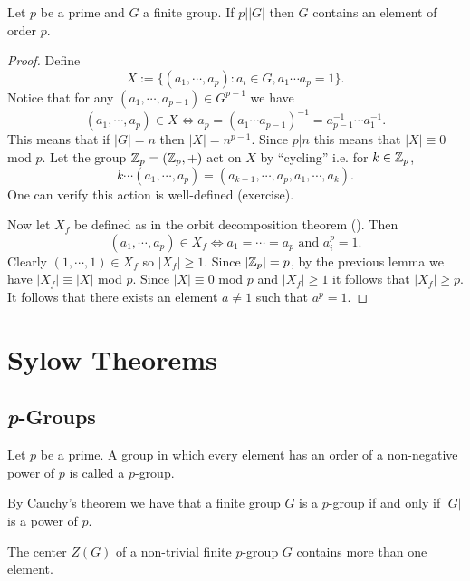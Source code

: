 \documentclass[11pt]{article}
\begin{document}
\begin{theorem}
    Let $p$ be a prime and $G$ a finite group. If $p\big||G|$ then $G$ contains an element of order $p$.
\end{theorem}

\begin{proof}
    Define
    \[X:=\{(a_1,\cdots,a_p):a_i\in G,a_1\cdots a_p=1\}.\]
    Notice that for any $(a_1,\cdots,a_{p-1})\in G^{p-1}$ we have
    \[(a_1,\cdots, a_p)\in X\iff a_p=(a_1\cdots a_{p-1})^{-1}=a_{p-1}^{-1}\cdots a_1^{-1}.\]
    This means that if $|G|=n$ then $|X|=n^{p-1}$. Since $p|n$ this means that $|X|\equiv0$ mod $p$. Let the group $\mathbb{Z}_p=(\mathbb{Z}_p,+)$ act on $X$ by ``cycling'' i.e. for $k\in\mathbb{Z}_p$,
    \[k\cdots(a_1,\cdots,a_p)=(a_{k+1},\cdots,a_p,a_1,\cdots,a_k).\]
    One can verify this action is well-defined (exercise).
    
    Now let $X_f$ be defined as in the orbit decomposition theorem (). Then
    \[(a_1,\cdots,a_p)\in X_f\iff a_1=\cdots=a_p\text{ and }a_i^p=1.\]
    Clearly $(1,\cdots,1)\in X_f$ so $|X_f|\geq1$. Since $|\mathbb{Z}_p|=p$, by the previous lemma we have $|X_f|\equiv|X|$ mod $p$. Since $|X|\equiv0$ mod $p$ and $|X_f|\geq1$ it follows that $|X_f|\geq p$. It follows that there exists an element $a\neq1$ such that $a^p=1$.
\end{proof}

\section{Sylow Theorems}

\subsection{\emph{p}-Groups}

\begin{definition}[$p$-Groups]
    Let $p$ be a prime. A group in which every element has an order of a non-negative power of $p$ is called a $p$-group.
\end{definition}

\begin{note}
    By Cauchy's theorem we have that a finite group $G$ is a $p$-group if and only if $|G|$ is a power of $p$.
\end{note}

\begin{lemma}
    The center $Z(G)$ of a non-trivial finite $p$-group $G$ contains more than one element.
\end{lemma}
\end{document}
